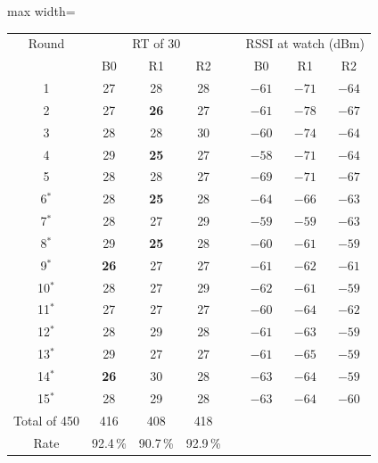 \IfFileExists{IEEEtran.cls}{\documentclass[conference]{IEEEtran}}{\documentclass[10pt,twocolumn]{article}}
\newcommand{\fitcol}[1]{\begin{adjustbox}{max width=\columnwidth}#1\end{adjustbox}}
\begin{document}
\begin{center}\footnotesize\setlength{\tabcolsep}{4pt}
\fitcol{\begin{tabular}{@{}c ccc c ccc@{}}
\toprule
Round & \multicolumn{3}{c}{RT of 30} & & \multicolumn{3}{c}{RSSI at watch (dBm)}\\
 & B0 & R1 & R2 & & B0 & R1 & R2\\
\midrule
1 & 27 & 28 & 28 & & $-61$ & $-71$ & $-64$\\
2 & 27 & \textbf{26} & 27 & & $-61$ & $-78$ & $-67$\\
3 & 28 & 28 & 30 & & $-60$ & $-74$ & $-64$\\
4 & 29 & \textbf{25} & 27 & & $-58$ & $-71$ & $-64$\\
5 & 28 & 28 & 27 & & $-69$ & $-71$ & $-67$\\
6$^{*}$ & 28 & \textbf{25} & 28 & & $-64$ & $-66$ & $-63$\\
7$^{*}$ & 28 & 27 & 29 & & $-59$ & $-59$ & $-63$\\
8$^{*}$ & 29 & \textbf{25} & 28 & & $-60$ & $-61$ & $-59$\\
9$^{*}$ & \textbf{26} & 27 & 27 & & $-61$ & $-62$ & $-61$\\
10$^{*}$ & 28 & 27 & 29 & & $-62$ & $-61$ & $-59$\\
11$^{*}$ & 27 & 27 & 27 & & $-60$ & $-64$ & $-62$\\
12$^{*}$ & 28 & 29 & 28 & & $-61$ & $-63$ & $-59$\\
13$^{*}$ & 29 & 27 & 27 & & $-61$ & $-65$ & $-59$\\
14$^{*}$ & \textbf{26} & 30 & 28 & & $-63$ & $-64$ & $-59$\\
15$^{*}$ & 28 & 29 & 28 & & $-63$ & $-64$ & $-60$\\
\midrule
Total of 450 & 416 & 408 & 418 & & & & \\
Rate & 92.4\,\% & 90.7\,\% & 92.9\,\% & & & & \\
\bottomrule
\end{tabular}}
\end{center}
\end{document}
